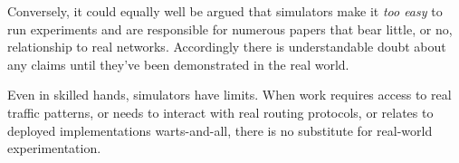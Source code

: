 Conversely, it could equally well be argued that simulators make it
{\em too easy} to run experiments and are responsible for numerous
papers that bear little, or no, relationship to real
networks. Accordingly there is understandable doubt about any claims
until they've been demonstrated in the real world.

Even in skilled hands, simulators have limits.
When work requires access to real traffic patterns, or needs to interact
with real routing protocols, or relates to deployed implementations
warts-and-all, there is no substitute for real-world experimentation.

